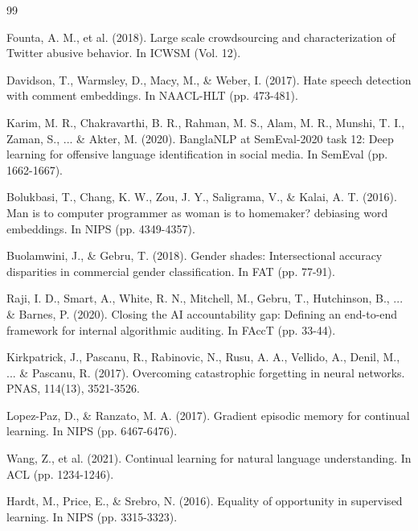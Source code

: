 \documentclass[conference]{IEEEtran}
\begin{document}
\begin{thebibliography}{99}

 Founta, A. M., et al. (2018). Large scale crowdsourcing and characterization of Twitter abusive behavior. In ICWSM (Vol. 12).

 Davidson, T., Warmsley, D., Macy, M., \& Weber, I. (2017). Hate speech detection with comment embeddings. In NAACL-HLT (pp. 473-481).

 Karim, M. R., Chakravarthi, B. R., Rahman, M. S., Alam, M. R., Munshi, T. I., Zaman, S., ... \& Akter, M. (2020). BanglaNLP at SemEval-2020 task 12: Deep learning for offensive language identification in social media. In SemEval (pp. 1662-1667).

 Bolukbasi, T., Chang, K. W., Zou, J. Y., Saligrama, V., \& Kalai, A. T. (2016). Man is to computer programmer as woman is to homemaker? debiasing word embeddings. In NIPS (pp. 4349-4357).

 Buolamwini, J., \& Gebru, T. (2018). Gender shades: Intersectional accuracy disparities in commercial gender classification. In FAT (pp. 77-91).

 Raji, I. D., Smart, A., White, R. N., Mitchell, M., Gebru, T., Hutchinson, B., ... \& Barnes, P. (2020). Closing the AI accountability gap: Defining an end-to-end framework for internal algorithmic auditing. In FAccT (pp. 33-44).

 Kirkpatrick, J., Pascanu, R., Rabinovic, N., Rusu, A. A., Vellido, A., Denil, M., ... \& Pascanu, R. (2017). Overcoming catastrophic forgetting in neural networks. PNAS, 114(13), 3521-3526.

 Lopez-Paz, D., \& Ranzato, M. A. (2017). Gradient episodic memory for continual learning. In NIPS (pp. 6467-6476).

 Wang, Z., et al. (2021). Continual learning for natural language understanding. In ACL (pp. 1234-1246).

 Hardt, M., Price, E., \& Srebro, N. (2016). Equality of opportunity in supervised learning. In NIPS (pp. 3315-3323).

\end{thebibliography}
\end{document}
